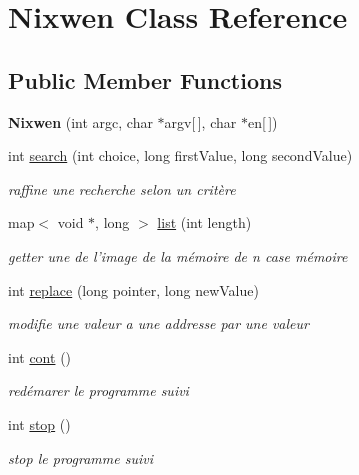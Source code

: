 \hypertarget{classNixwen}{\section{Nixwen Class Reference}
\label{classNixwen}
}
\subsection*{Public Member Functions}
\begin{DoxyCompactItemize}
\item 
\hypertarget{classNixwen_a405cdb4932df71d29a9524f415b68f17}{{\bfseries Nixwen} (int argc, char $\ast$argv\mbox{[}$\,$\mbox{]}, char $\ast$en\mbox{[}$\,$\mbox{]})}\label{classNixwen_a405cdb4932df71d29a9524f415b68f17}

\item 
int \hyperlink{classNixwen_a4946a70100d56189ce4dc09558d0e06a}{search} (int choice, long first\-Value, long second\-Value)
\begin{DoxyCompactList}\small\item\em raffine une recherche selon un critère \end{DoxyCompactList}\item 
map$<$ void $\ast$, long $>$ \hyperlink{classNixwen_a3cc43b333344136f45a5c57e8e7d19ea}{list} (int length)
\begin{DoxyCompactList}\small\item\em getter une de l'image de la mémoire de n case mémoire \end{DoxyCompactList}\item 
int \hyperlink{classNixwen_a4a1f1562b9839b3954753c1457b1e7ef}{replace} (long pointer, long new\-Value)
\begin{DoxyCompactList}\small\item\em modifie une valeur a une addresse par une valeur \end{DoxyCompactList}\item 
int \hyperlink{classNixwen_ad1c0ae1ea84ff210bfef559604b40da9}{cont} ()
\begin{DoxyCompactList}\small\item\em redémarer le programme suivi \end{DoxyCompactList}\item 
int \hyperlink{classNixwen_a00280c84cf8f46b62b314489ef5f9cad}{stop} ()
\begin{DoxyCompactList}\small\item\em stop le programme suivi \end{DoxyCompactList}\item 

\end{DoxyCompactItemize}
